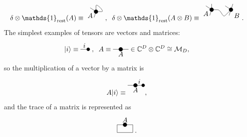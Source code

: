 \documentclass[smallextended]{svjour3}
\renewcommand{\1}{\mathbbm{1}}
\newcommand{\id}{\mathds{1}}
\newcommand{\ket} [1] {\vert #1 \rangle}
\begin{document}
\begin{equation*}
    \delta\otimes \id_{\rm rest} (A) \equiv
    \begin{tikzpicture}
        \filldraw (0,0) circle (0.1);
        \draw (0,0)--(-0.1,-0.3);
        \draw (0,0)--(0,0.3);
        \draw (0,0)--(-0.3,0.2);
        \draw (0,0)--(0.3,0);
        \node at (-0.3,-0.2) {$A$};
        \draw  (0.3,0) to [out=0, in=90] (0,0.3);
    \end{tikzpicture},
    \;\; \delta\otimes \id_{\rm rest} (A\otimes B) \equiv
    \begin{tikzpicture}
        \filldraw (0,0) circle (0.1);
        \draw (0,0)--(-0.1,-0.3);
        \draw (0,0)--(0,0.3);
        \draw (0,0)--(-0.3,0.2);
        \draw (0,0)--(0.3,0);
        \node at (-0.3,-0.2) {$A$};
        \filldraw (1,0) circle (0.1);
        \draw (1,0)--(0.9,-0.3);
        \draw (1,0)--(1.1,0.3);
        \draw (1,0)--(0.7,0.2);
        \draw (1,0)--(0.7,-0.3);
        \node at (1.3,-0.3) {$B$};
        \draw  (0.3,0) to [out=0, in=-135] (0.7,-0.3);
    \end{tikzpicture}.
\end{equation*}
The simplest examples of tensors are vectors and matrices:
\begin{equation*}
    \ket{i}\equiv
    \begin{tikzpicture} [baseline=-1mm]
        \filldraw (0,0) circle (0.08);
        \node at (-0.2,0.2) {$i$};
        \draw (0,0)--(-0.4,0);
    \end{tikzpicture}
    \; ,\;\; A\equiv
    \begin{tikzpicture}[baseline=-1mm]
        \node at (0,-0.25) {$A$};
        \filldraw (0,0) circle (0.1);
        \draw (-0.4,0)--(0.4,0);
    \end{tikzpicture}
    \in \mathbb{C}^D\otimes \mathbb{C}^D\cong \mathcal{M}_D,
\end{equation*}
so the multiplication of a vector by a matrix is
\begin{equation*}
    A\ket{i}\equiv
    \begin{tikzpicture}
        \filldraw (0.4,0) circle (0.08);
        \filldraw (0,0) circle (0.1);
        \node at (0.2,0.2) {$i$};
        \node at (0,-0.25) {$A$};
        \draw (-0.4,0)--(0.4,0);
    \end{tikzpicture},
\end{equation*}
and the trace of a matrix is represented as
\begin{equation*}
    \begin{tikzpicture}
        \filldraw (0,0) circle (0.1);
        \node at (0,0.25) {$A$};
        \draw (-0.4,0)--(0.4,0)--(0.4,-0.4)--(-0.4,-0.4)--(-0.4,0);
    \end{tikzpicture} \; .
\end{equation*}
\end{document}
